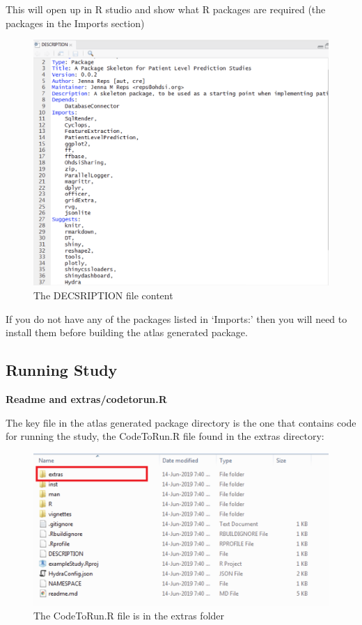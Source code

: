 \documentclass[11pt]{book}
\begin{document}
This will open up in R studio and show what R packages are required (the
packages in the Imports section)

\begin{figure}
\includegraphics[width=1\linewidth]{images/PatientLevelPrediction/atlasImplementation/description} \caption{The DECSRIPTION file content}\label{fig:figureU16}
\end{figure}

If you do not have any of the packages listed in `Imports:' then you
will need to install them before building the atlas generated package.

\subsection{Running Study}\label{running-study}

\textbf{Readme and extras/codetorun.R}

The key file in the atlas generated package directory is the one that
contains code for running the study, the CodeToRun.R file found in the
extras directory:

\begin{figure}
\includegraphics[width=1\linewidth]{images/PatientLevelPrediction/atlasImplementation/download_folder_extras} \caption{The CodeToRun.R file is in the extras folder}\label{fig:figureU17}
\end{figure}
\end{document}

